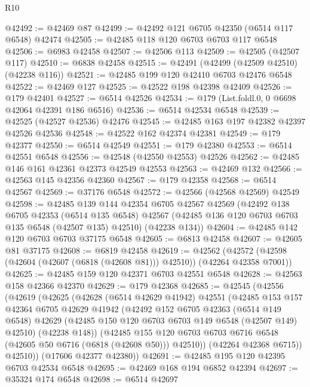 \begin{lexlean}{R10}
\begin{coremodule}
@42492 := @42469 @87
@42499 := @42492 @121 @6705 @42350 (@6514 @117 @6548) @42474
@42505 := @42485 @118 @120 @6703 @6703 @117 @6548
@42506 := @6983 @42458
@42507 := @42506 @113
@42509 := @42505 (@42507 @117)
@42510 := @6838 @42458
@42515 := @42491 (@42499 (@42509 @42510) (@42238 @116))
@42521 := @42485 @199 @120 @42410 @6703 @42476 @6548
@42522 := @42469 @127
@42525 := @42522 @198 @42398 @42409
@42526 := @179 @42401
@42527 := @6514 @42526
@42534 := @179 (List.foldl.{0, 0} @6698 @42064 @42391 @186 @6516)
@42536 := @6514 @42534 @6548
@42539 := @42525 (@42527 @42536) @42476
@42545 := @42485 @163 @197 @42382 @42397 @42526 @42536
@42548 := @42522 @162 @42374 @42381
@42549 := @179 @42377
@42550 := @6514 @42549
@42551 := @179 @42380
@42553 := @6514 @42551 @6548
@42556 := @42548 (@42550 @42553) @42526
@42562 := @42485 @146 @161 @42361 @42373 @42549 @42553
@42563 := @42469 @132
@42566 := @42563 @145 @42356 @42360
@42567 := @179 @42358
@42568 := @6514 @42567
@42569 := @37176 @6548
@42572 := @42566 (@42568 @42569) @42549
@42598 := @42485
    @139
    @144
    @42354
    @6705
    @42567
    @42569
    (@42492
      @138
      @6705
      @42353
      (@6514 @135 @6548)
      @42567
      (@42485 @136 @120 @6703 @6703 @135 @6548 (@42507 @135) @42510)
      (@42238 @134))
@42604 := @42485 @142 @120 @6703 @6703 @37175 @6548
@42605 := @6813 @42458
@42607 := @42605 @81 @37175
@42608 := @6819 @42458
@42619 := @42562
    (@42572 (@42598 (@42604 (@42607 (@6818 (@42608 @81))) @42510)) (@42264 @42358 @7001))
@42625 := @42485 @159 @120 @42371 @6703 @42551 @6548
@42628 := @42563 @158 @42366 @42370
@42629 := @179 @42368
@42685 := @42545
    (@42556
      (@42619
        (@42625
          (@42628
            (@6514 @42629 @41942)
            @42551
            (@42485
              @153
              @157
              @42364
              @6705
              @42629
              @41942
              (@42492
                @152
                @6705
                @42363
                (@6514 @149 @6548)
                @42629
                (@42485 @150 @120 @6703 @6703 @149 @6548 (@42507 @149) @42510)
                (@42238 @148))
              (@42485
                @155
                @120
                @6703
                @6703
                @6716
                @6548
                (@42605 @50 @6716 (@6818 (@42608 @50)))
                @42510))
            (@42264 @42368 @6715))
          @42510))
      (@17606 @42377 @42380))
@42691 := @42485 @195 @120 @42395 @6703 @42534 @6548
@42695 := @42469 @168 @194 @6852 @42394
@42697 := @35324 @174 @6548
@42698 := @6514 @42697

\end{coremodule}
\end{lexlean}
